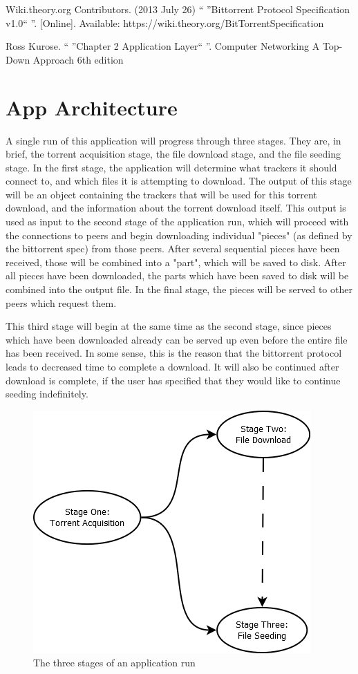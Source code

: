 \documentclass[letter]{scrartcl}
\begin{document}
Wiki.theory.org Contributors. (2013 July 26) `` ''Bittorrent Protocol Specification v1.0`` ''. [Online]. Available: https://wiki.theory.org/BitTorrentSpecification

Ross Kurose. `` ''Chapter 2 Application Layer`` ''. Computer Networking A Top-Down Approach 6th edition

\section{App Architecture}
A single run of this application will progress through three stages.  They are, in brief, the torrent acquisition stage, the file download stage, and the file seeding stage.  In the first stage, the application will determine what trackers it should connect to, and which files it is attempting to download.  The output of this stage will be an object containing the trackers that will be used for this torrent download, and the information about the torrent download itself.  This output is used as input to the second stage of the application run, which will proceed with the connections to peers and begin downloading individual "pieces" (as defined by the bittorrent spec) from those peers.  After several sequential pieces have been received, those will be combined into a "part", which will be saved to disk.  After all pieces have been downloaded, the parts which have been saved to disk will be combined into the output file.  In the final stage, the pieces will be served to other peers which request them.

This third stage will begin at the same time as the second stage, since pieces which have been downloaded already can be served up even before the entire file has been received.  In some sense, this is the reason that the bittorrent protocol leads to decreased time to complete a download.  It will also be continued after download is complete, if the user has specified that they would like to continue seeding indefinitely.

\begin{figure}[h]
\centering
\includegraphics[scale=.5]{stageDiagram.png}
\caption{The three stages of an application run}
\end{figure}
\end{document}
